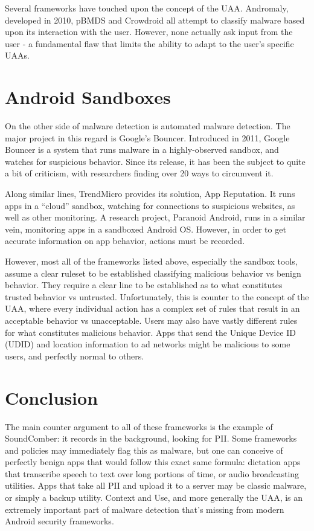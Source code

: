 Several frameworks have touched upon the concept of the UAA. Andromaly\citep{shabtai2012andromaly}, developed in 2010, pBMDS\citep{xie2010pbmds} and Crowdroid\citep{burguera2011crowdroid} all attempt to classify malware based upon its interaction with the user. However, none actually ask input from the user - a fundamental flaw that limits the ability to adapt to the user's specific UAAs.

\section{Android Sandboxes}
On the other side of malware detection is automated malware detection. The major project in this regard is Google's Bouncer\citep{googlebouncer}. Introduced in 2011, Google Bouncer is a system that runs malware in a highly-observed sandbox, and watches for suspicious behavior. Since its release, it has been the subject to quite a bit of criticism\citep{mansfield2012android}, with researchers finding over 20 ways to circumvent it.

Along similar lines, TrendMicro provides its solution, App Reputation\citep{trendmicroappreputation}. It runs apps in a ``cloud'' sandbox, watching for connections to suspicious websites, as well as other monitoring. A research project, Paranoid Android\citep{portokalidis2010paranoid}, runs in a similar vein, monitoring apps in a sandboxed Android OS. However, in order to get accurate information on app behavior, actions must be recorded.

However, most all of the frameworks listed above, especially the sandbox tools, assume a clear ruleset to be established classifying malicious behavior vs benign behavior. They require a clear line to be established as to what constitutes trusted behavior vs untrusted. Unfortunately, this is counter to the concept of the UAA, where every individual action has a complex set of rules that result in an acceptable behavior vs unacceptable. Users may also have vastly different rules for what constitutes malicious behavior. Apps that send the Unique Device ID (UDID) and location information to ad networks might be malicious to some users, and perfectly normal to others.


\section{Conclusion}
The main counter argument to all of these frameworks is the example of SoundComber: it records in the background, looking for PII. Some frameworks and policies may immediately flag this as malware, but one can conceive of perfectly benign apps that would follow this exact same formula: dictation apps that transcribe speech to text over long portions of time, or audio broadcasting utilities. Apps that take all PII and upload it to a server may be classic malware, or simply a backup utility. Context and Use, and more generally the UAA, is an extremely important part of malware detection that's missing from modern Android security frameworks.

